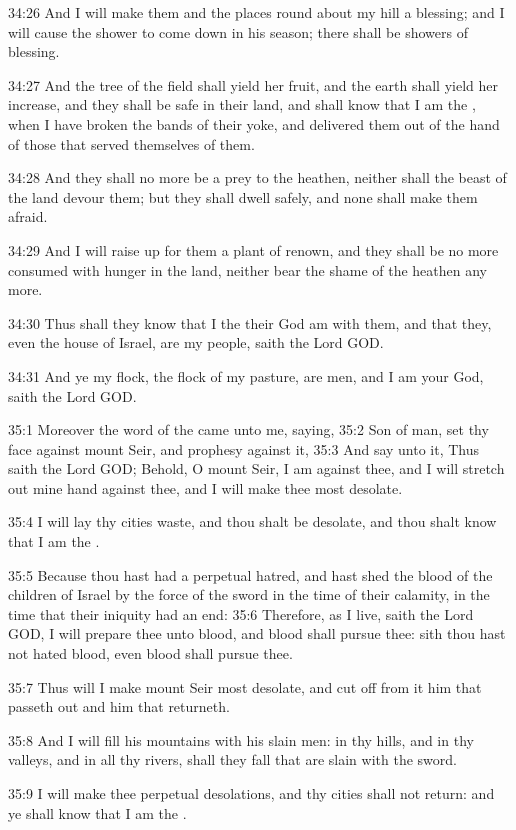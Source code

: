 34:26 And I will make them and the places round about my hill a blessing; and I will cause the shower to come down in his season; there shall be showers of blessing.

34:27 And the tree of the field shall yield her fruit, and the earth shall yield her increase, and they shall be safe in their land, and shall know that I am the \LORD, when I have broken the bands of their yoke, and delivered them out of the hand of those that served themselves of them.

34:28 And they shall no more be a prey to the heathen, neither shall the beast of the land devour them; but they shall dwell safely, and none shall make them afraid.

34:29 And I will raise up for them a plant of renown, and they shall be no more consumed with hunger in the land, neither bear the shame of the heathen any more.

34:30 Thus shall they know that I the \LORD their God am with them, and that they, even the house of Israel, are my people, saith the Lord GOD.

34:31 And ye my flock, the flock of my pasture, are men, and I am your God, saith the Lord GOD.

35:1 Moreover the word of the \LORD came unto me, saying, 35:2 Son of man, set thy face against mount Seir, and prophesy against it, 35:3 And say unto it, Thus saith the Lord GOD; Behold, O mount Seir, I am against thee, and I will stretch out mine hand against thee, and I will make thee most desolate.

35:4 I will lay thy cities waste, and thou shalt be desolate, and thou shalt know that I am the \LORD.

35:5 Because thou hast had a perpetual hatred, and hast shed the blood of the children of Israel by the force of the sword in the time of their calamity, in the time that their iniquity had an end: 35:6 Therefore, as I live, saith the Lord GOD, I will prepare thee unto blood, and blood shall pursue thee: sith thou hast not hated blood, even blood shall pursue thee.

35:7 Thus will I make mount Seir most desolate, and cut off from it him that passeth out and him that returneth.

35:8 And I will fill his mountains with his slain men: in thy hills, and in thy valleys, and in all thy rivers, shall they fall that are slain with the sword.

35:9 I will make thee perpetual desolations, and thy cities shall not return: and ye shall know that I am the \LORD.

